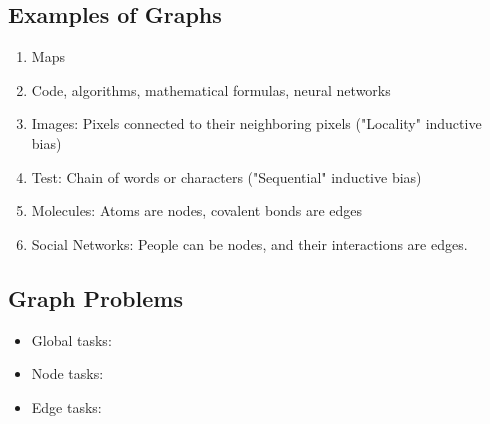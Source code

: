 \subsection{Examples of Graphs}
\begin{example}
    \begin{enumerate}
        \item Maps
        \item Code, algorithms, mathematical formulas, neural networks 
        \item Images: Pixels connected to their neighboring pixels ("Locality" inductive bias)
        \item Test: Chain of words or characters ("Sequential" inductive bias)
        \item Molecules: Atoms are nodes, covalent bonds are edges
        \item Social Networks: People can be nodes, and their interactions are edges. 
    \end{enumerate}
\end{example}
\newpage

\subsection{Graph Problems}
\begin{notes}
    \begin{itemize}
        \item Global tasks:
        \item Node tasks:
        \item Edge tasks:
    \end{itemize}
\end{notes}

